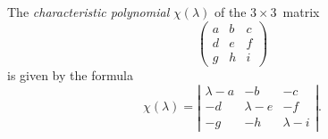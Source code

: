 \documentclass[a4paper,12pt]{article}
\begin{document}

The \emph{characteristic polynomial} $\chi(\lambda)$ of the $3 \times 3$~matrix
\[ \left(
 \begin{array}{ccc}
    a & b & c \\
    d & e & f \\
    g & h & i
 \end{array}
\right)\]
is given by the formula
\[ \chi(\lambda) = \left|
 \begin{array}{ccc}
    \lambda - a & -b & -c \\
    -d & \lambda - e & -f \\
    -g & -h & \lambda - i
 \end{array}
\right| .\]
\end{document}
